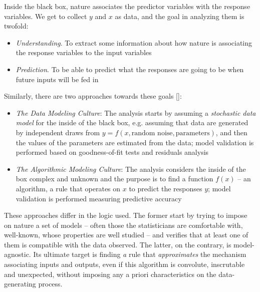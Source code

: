 \begin{figure}[h!]
    \centering
\end{figure}
Inside the black box, nature associates the predictor variables with the response variables. We get to collect $y$ and $x$ as data, and the goal in analyzing them is twofold:
\begin{itemize}
    \setlength\itemsep{0cm}
    \item[] \textit{Understanding}. To extract some information about how nature is associating the response variables to the input variables
    \item[] \textit{Prediction}. To be able to predict what the responses are going to be when future inputs will be fed in
\end{itemize}
Similarly, there are two approaches towards these goals [\cite{Breiman2001}]:
\begin{itemize}
    \item \textit{The Data Modeling Culture}: The analysis starts by assuming a \textit{stochastic data model} for the inside of the black box, e.g. assuming that data are generated by independent draws from $y = f(x, \text{random noise}, \text{parameters})$, and then the values of the parameters are estimated from the data; model validation is performed based on goodness-of-fit tests and residuals analysis
    \item \textit{The Algorithmic Modeling Culture}: The analysis considers the inside of the box complex and unknown and the purpose is to find a function $f(x)$ -- an algorithm, a rule that operates on $x$ to predict the responses $y$; model validation is performed measuring predictive accuracy
\end{itemize}

These approaches differ in the logic used. The former start by trying to impose on nature a set of models -- often those the statisticians are comfortable with, well-known, whose properties are well studied -- and verifies that at least one of them is compatible with the data observed. The latter, on the contrary, is model-agnostic. Its ultimate target is finding \textit{a} rule that \textit{approximates} the mechanism associating inputs and outputs, even if this algorithm is convolute, inscrutable and unexpected, without imposing any a priori characteristics on the data-generating process. 

